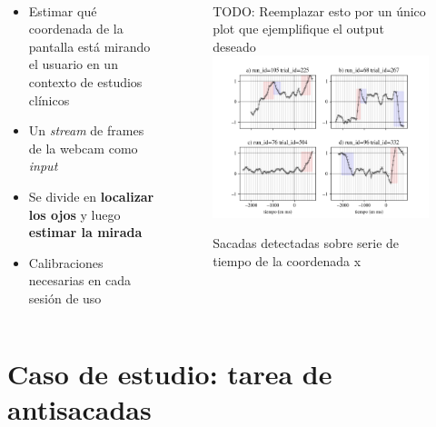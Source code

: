 \documentclass[aspectratio=169]{beamer}
\begin{document}
\begin{frame}{~}
  \begin{columns}
    \begin{column}{0.5\textwidth}
      \begin{itemize}
        \item Estimar qué coordenada de la pantalla está mirando el usuario en
          un contexto de estudios clínicos
        \item Un \textit{stream} de frames de la webcam como \textit{input}
        \item Se divide en \textbf{localizar los ojos} y luego \textbf{estimar
          la mirada}
        \item Calibraciones necesarias en cada sesión de uso
      \end{itemize}
    \end{column}
    \begin{column}{0.5\textwidth}
      \begin{figure}
        \centering
        TODO: Reemplazar esto por un único plot que ejemplifique el output
        deseado
        \includegraphics[width=\linewidth]{img/eye-tracking-output-example.png}
        \caption{Sacadas detectadas sobre serie de tiempo de la coordenada x}
      \end{figure}
    \end{column}
  \end{columns}
\end{frame}

\section{Caso de estudio: tarea de antisacadas}
\end{document}
